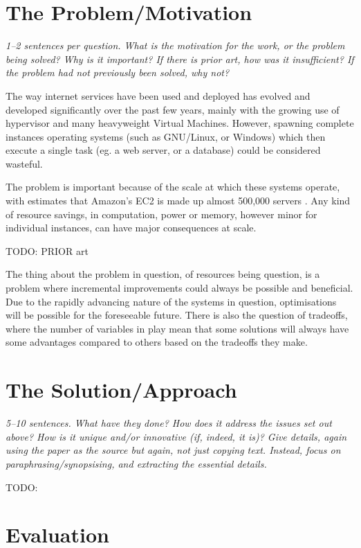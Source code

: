 \documentclass[11pt]{article}
\begin{document}
\section*{The Problem/Motivation}

\textsl{1--2 sentences per question. What is the motivation for the work, or
the problem being solved? Why is it important? If there is prior art, how was
it insufficient? If the problem had not previously been solved, why not?}

The way internet services have been used and deployed has evolved and developed
significantly over the past few years, mainly with the growing use of
hypervisor and many heavyweight Virtual Machines. However, spawning complete
instances operating systems (such as GNU/Linux, or Windows) which then execute
a single task (eg. a web server, or a database) could be considered wasteful.

The problem is important because of the scale at which these systems operate,
with estimates that Amazon's EC2 is made up almost 500,000 servers
\cite{EC2Amount}. Any kind of resource savings, in computation, power or
memory, however minor for individual instances, can have major consequences
at scale.

TODO: PRIOR art

The thing about the problem in question, of resources being question, is a
problem where incremental improvements could always be possible and beneficial.
Due to the rapidly advancing nature of the systems in question, optimisations
will be possible for the foreseeable future. There is also the question of
tradeoffs, where the number of variables in play mean that some solutions will
always have some advantages compared to others based on the tradeoffs they
make.


\section*{The Solution/Approach}

\textsl{5--10 sentences. What have they done? How does it address the issues
set out above? How is it unique and/or innovative (if, indeed, it is)? Give
details, again using the paper as the source but again, not just copying text.
Instead, focus on paraphrasing/synopsising, and extracting the essential
details.} %

TODO:


\section*{Evaluation}
\end{document}
